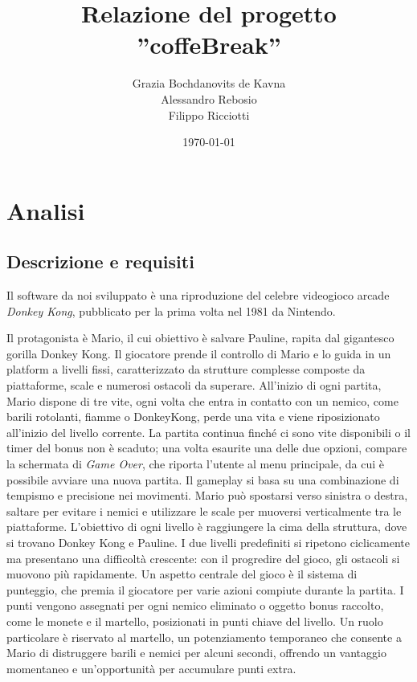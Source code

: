\documentclass[a4paper,12pt]{report}
\title{Relazione del progetto\\''coffeBreak''}
\author{Grazia Bochdanovits de Kavna\\
Alessandro Rebosio\\
Filippo Ricciotti
}
\date{\today}
\begin{document}
\maketitle

\tableofcontents

\chapter{Analisi}

\section{Descrizione e requisiti}
Il software da noi sviluppato è una riproduzione del celebre videogioco arcade \textit{Donkey Kong}, pubblicato per la prima volta nel 1981 da Nintendo.

Il protagonista è Mario, il cui obiettivo è salvare Pauline, rapita dal gigantesco gorilla Donkey Kong.
%
Il giocatore prende il controllo di Mario e lo guida in un platform a livelli fissi, caratterizzato da strutture complesse
composte da piattaforme, scale e numerosi ostacoli da superare.
%
All'inizio di ogni partita, Mario dispone di tre vite, ogni volta che entra in contatto con un nemico, come barili rotolanti, fiamme o DonkeyKong, perde una vita e viene riposizionato
all'inizio del livello corrente.
%
La partita continua finché ci sono vite disponibili o il timer del bonus non è scaduto; una volta esaurite una delle due opzioni, compare la schermata di \textit{Game Over},
che riporta l'utente al menu principale, da cui è possibile avviare una nuova partita.
%
Il gameplay si basa su una combinazione di tempismo e precisione nei movimenti.
Mario può spostarsi verso sinistra o destra, saltare per evitare i nemici e utilizzare le scale per muoversi verticalmente tra le piattaforme.
L'obiettivo di ogni livello è raggiungere la cima della struttura, dove si trovano Donkey Kong e Pauline.
%
I due livelli predefiniti si ripetono ciclicamente ma presentano una difficoltà crescente:
con il progredire del gioco, gli ostacoli si muovono più rapidamente.
%
Un aspetto centrale del gioco è il sistema di punteggio, che premia il giocatore per varie azioni compiute durante la partita.
I punti vengono assegnati per ogni nemico eliminato o oggetto bonus raccolto, come le monete e il martello,
posizionati in punti chiave del livello.
%
Un ruolo particolare è riservato al martello, un potenziamento temporaneo che consente a Mario di distruggere barili e nemici per alcuni secondi,
offrendo un vantaggio momentaneo e un'opportunità per accumulare punti extra.
\end{document}

